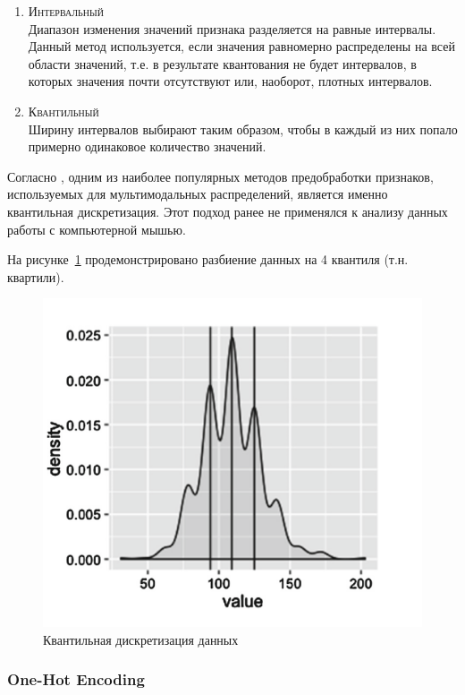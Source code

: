 \documentclass[12pt]{article}
\begin{document}
    \begin{enumerate}
        \item \textsc{Интервальный} \\
        Диапазон изменения значений признака разделяется на равные интервалы. Данный метод используется, если значения равномерно распределены на всей области значений, т.е. в результате квантования не будет интервалов, в которых значения почти отсутствуют или, наоборот, плотных интервалов.
        \item \textsc{Квантильный} \\
        Ширину интервалов выбирают таким образом, чтобы в каждый из них попало примерно одинаковое количество значений.
    \end{enumerate}

    \par Согласно \cite{Kazachuk}, одним из наиболее популярных методов предобработки признаков, используемых для мультимодальных распределений, является именно квантильная дискретизация. Этот подход ранее не применялся к анализу данных работы с компьютерной мышью.

    \par На рисунке~\ref{sec:Research:FeatureSpace:Quantile:fig:Quantile} продемонстрировано разбиение данных на 4 квантиля (т.н. квартили).

    \begin{figure}[h!]
        \centering
        \includegraphics[width=0.75\linewidth]{quantile.png}
        \caption{Квантильная дискретизация данных}
        \label{sec:Research:FeatureSpace:Quantile:fig:Quantile}
    \end{figure}


    \subsubsection{One-Hot Encoding}
    \label{sec:Research:FeatureSpace:OneHotEncoding}
\end{document}
